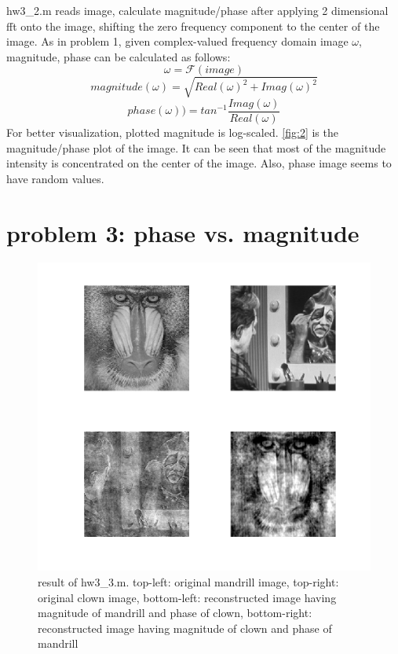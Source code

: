 \documentclass[extendedabs]{bmvc2k}
\begin{document}
hw3\_2.m reads image, calculate magnitude/phase after applying 2 dimensional fft
onto the image, shifting the zero frequency component to the center of the image.
As in problem 1, given complex-valued frequency domain image $\omega$, magnitude, phase can be calculated as follows:
\[\omega = \mathcal{F}(image)\]
\[magnitude(\omega) = \sqrt{Real(\omega)^2 + Imag(\omega)^2}\]
\[phase(\omega)) = tan^{-1}\frac{Imag(\omega)}{Real(\omega)}\]
For better visualization, plotted magnitude is log-scaled.
\figurename{\ref{fig:2}} is the magnitude/phase plot of the image.
It can be seen that most of the magnitude intensity is concentrated on the center of the image.
Also, phase image seems to have random values.

\section*{problem 3: phase vs. magnitude}

\begin{figure}[h]
    \centering
    \includegraphics[width=\linewidth]{hw3_3_1}
    \caption{result of hw3\_3.m. top-left: original mandrill image, top-right: original clown image,
    bottom-left: reconstructed image having magnitude of mandrill and phase of clown,
    bottom-right: reconstructed image having magnitude of clown and phase of mandrill}
    \label{fig:3}
\end{figure}
\end{document}
